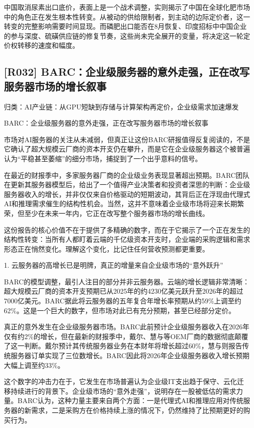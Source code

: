\documentclass[11pt]{ctexart}
\begin{document}
中国取消尿素出口底价，表面上是一个战术调整，实则揭示了中国在全球化肥市场中的角色正在发生根本性转变。从被动的供给限制者，到主动的边际定价者，这一转变的完整影响需要时间显现。而磷肥出口能否在8月恢复、印度招标中中国企业的参与深度、硫磺供应链的修复节奏，这些尚未完全展开的变量，将决定这一轮定价权转移的速度和幅度。

\subsection{[R032] BARC：企业级服务器的意外走强，正在改写服务器市场的增长叙事}
{\small\color{refgray}归类：AI产业链：从GPU短缺到存储与计算架构再定价，企业级需求加速爆发}

BARC：企业级服务器的意外走强，正在改写服务器市场的增长叙事

市场对AI服务器的关注从未减弱，但真正让这份BARC研报值得反复阅读的，不是它确认了超大规模云厂商的资本开支仍在攀升，而是它在企业级服务器这个被普遍认为“平稳甚至萎缩”的细分市场，捕捉到了一个出乎意料的信号。

在最近的财报季中，多家服务器厂商的企业级业务表现显著超出预期。BARC团队在更新其服务器模型后，给出了一个值得产业决策者和投资者深思的判断：企业级服务器收入的增长，并非仅仅来自价格驱动的短期波动，其背后正在浮现由代理式AI和推理需求催生的结构性机会。当然，这并不意味着企业级市场将迎来长期繁荣，但至少在未来一年内，它正在改写整个服务器市场的增长曲线。

这份报告的核心价值不在于提供了多精确的数字，而在于它揭示了一个正在发生的结构性转变：当所有人都盯着云端的千亿级资本开支时，企业端的采购逻辑和需求形态正在悄然变化。理解这个变化，比记住任何营收预测都更重要。

1. 云服务器的高增长已是明牌，真正的增量来自企业级市场的“意外跃升”

BARC的模型调整，最引人注目的部分并非云服务器。云端的增长逻辑非常清晰：超大规模云厂商的资本开支预期已从2025年的约4230亿美元跃升至2026年的超过7000亿美元。BARC据此将云服务器的五年复合年增长率预期从约59\%上调至约62\%。这是一个巨大的数字，但市场对此已有充分预期，甚至已经部分定价。

真正的意外发生在企业级服务器市场。BARC此前预计企业级服务器收入在2026年仅有约2\%的增长，但在最新的财报季中，戴尔、慧与等OEM厂商的数据彻底颠覆了这一判断。戴尔预计其传统服务器业务在本财年将增长超过60\%，慧与则报告传统服务器订单实现了三位数增长。BARC因此将2026年企业级服务器收入增长预期大幅上调至约33\%。

这个数字的冲击力在于，它发生在市场普遍认为企业级IT支出趋于保守、云化迁移持续进行的背景下。企业级市场的“意外走强”，说明存在一股被低估的需求力量。BARC认为，这种力量主要来自两个方面：一是代理式AI和推理应用对传统服务器的新需求，二是采购方在价格持续上涨的情况下，仍然维持了比预期更好的购买行为。
\end{document}
